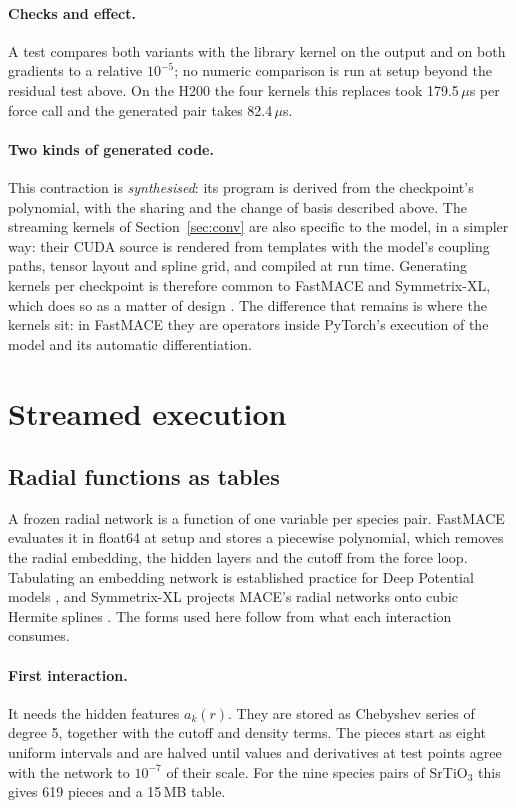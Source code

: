 \documentclass[11pt]{article}
\newcommand{\us}{\,\ensuremath{\mu}s}
\begin{document}
\paragraph{Checks and effect.}
A test compares both variants with the library kernel on the output and on both gradients to a relative
$10^{-5}$; no numeric comparison is run at setup beyond the residual test above. On the H200 the four kernels
this replaces took 179.5\us{} per force call and the generated pair takes 82.4\us{}.

\paragraph{Two kinds of generated code.}
This contraction is \emph{synthesised}: its program is derived from the checkpoint's polynomial, with the
sharing and the change of basis described above. The streaming kernels of Section~\ref{sec:conv} are also
specific to the model, in a simpler way: their CUDA source is rendered from templates with the model's coupling
paths, tensor layout and spline grid, and compiled at run time. Generating kernels per checkpoint is therefore
common to FastMACE and Symmetrix-XL, which does so as a matter of design \cite{fu2026symmetrixxl}. The
difference that remains is where the kernels sit: in FastMACE they are operators inside PyTorch's execution of
the model and its automatic differentiation.

\section{Streamed execution}
\label{sec:stream}

\subsection{Radial functions as tables}
\label{sec:tables}

A frozen radial network is a function of one variable per species pair. FastMACE evaluates it in float64 at setup
and stores a piecewise polynomial, which removes the radial embedding, the hidden layers and the cutoff from the
force loop. Tabulating an embedding network is established practice for Deep Potential models
\cite{lu2022dpcompress}, and Symmetrix-XL projects MACE's radial networks onto cubic Hermite splines
\cite{fu2026symmetrixxl}. The forms used here follow from what each interaction consumes.

\paragraph{First interaction.}
It needs the hidden features $a_k(r)$. They are stored as Chebyshev series \cite{trefethen2013atap} of degree 5,
together with the cutoff and density terms. The pieces start as eight uniform intervals and are halved until
values and derivatives at test points agree with the network to $10^{-7}$ of their scale. For the nine species
pairs of SrTiO$_3$ this gives 619 pieces and a 15\,MB table.
\end{document}
